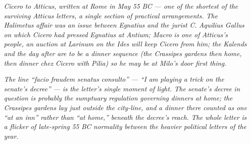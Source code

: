 
\textit{Cicero to Atticus, written at Rome in May 55 BC --- one
of the shortest of the surviving Atticus letters, a single
section of practical arrangements. The Halimetus affair was an
issue between Egnatius and the jurist C. Aquilius Gallus on
which Cicero had pressed Egnatius at Antium; Macro is one of
Atticus's people, an auction at Larinum on the Ides will keep
Cicero from him; the Kalends and the day after are to be a
dinner sequence (the Crassipes gardens then home, then dinner
chez Cicero with Pilia) so he may be at Milo's door first
thing.}

\textit{The line ``facio fraudem senatus consulto'' --- ``I am
playing a trick on the senate's decree'' --- is the letter's
single moment of light. The senate's decree in question is
probably the sumptuary regulation governing dinners at home;
the Crassipes gardens lay just outside the city-line, and a
dinner there counted as one ``at an inn'' rather than ``at
home,'' beneath the decree's reach. The whole letter is a
flicker of late-spring 55 BC normality between the heavier
political letters of the year.}
